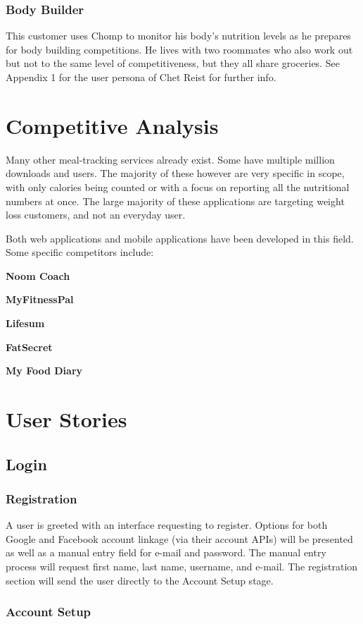 \documentclass[a4paper,12pt]{article}
\begin{document}
\subsubsection*{Body Builder}
This customer uses Chomp to monitor his body's nutrition levels as he prepares for body building competitions.  He lives with two roommates who also work out but not to the same level of competitiveness, but they all share groceries.  See Appendix 1 for the user persona of Chet Reist for further info.
\section*{Competitive Analysis}
Many other meal-tracking services already exist.  Some have multiple million downloads and users.  The majority of these however are very specific in scope, with only calories being counted or with a focus on reporting all the nutritional numbers at once.  The large majority of these applications are targeting weight loss customers, and not an everyday user.

Both web applications and mobile applications have been developed in this field.  Some specific competitors include: \begin{list}{•}{•}
\item \textbf{Noom Coach}
\item \textbf{MyFitnessPal}
\item \textbf{Lifesum}
\item \textbf{FatSecret}
\item \textbf{My Food Diary}
\end{list}
\section*{User Stories}
\subsection{Login}
\subsubsection{Registration}
A user is greeted with an interface requesting to register.  Options for both Google and Facebook account linkage (via their account APIs) will be presented as well as a manual entry field for e-mail and password.  The manual entry process will request first name, last name, username, and e-mail.  The registration section will send the user directly to the Account Setup stage.
\subsubsection{Account Setup}
\end{document}
